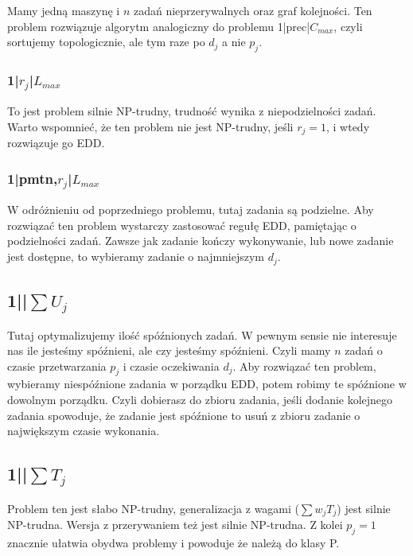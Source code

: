 \documentclass{../notatki}
\begin{document}
Mamy jedną maszynę i $n$ zadań nieprzerywalnych oraz graf kolejności.
Ten problem rozwiązuje algorytm analogiczny do problemu 1|prec|$C_{max}$, czyli
sortujemy topologicznie, ale tym raze po $d_j$ a nie $p_j$.

\subsubsection{1|\texorpdfstring{$r_j$}{rj}|\texorpdfstring{$L_{max}$}{Lmax}}

To jest problem silnie NP-trudny, trudność wynika z niepodzielności zadań.
Warto wspomnieć, że ten problem nie jest NP-trudny, jeśli $r_j = 1$, i wtedy
rozwiązuje go EDD.

\subsubsection{1|pmtn,\texorpdfstring{$r_j$}{rj}|\texorpdfstring{$L_{max}$}{Lmax}}

W odróżnieniu od poprzedniego problemu, tutaj zadania są podzielne.
Aby rozwiązać
ten problem wystarczy zastosować regułę EDD, pamiętając o podzielności zadań.
Zawsze jak zadanie kończy wykonywanie, lub nowe zadanie jest dostępne, to
wybieramy zadanie o najmniejszym $d_j$.

\subsection{1||\texorpdfstring{$\sum U_j$}{sum Uj}}

Tutaj optymalizujemy ilość spóźnionych zadań. W pewnym sensie nie interesuje
nas ile jesteśmy spóźnieni, ale czy jesteśmy spóźnieni. Czyli mamy $n$ zadań
o czasie przetwarzania $p_j$ i czasie oczekiwania $d_j$. Aby
rozwiązać ten problem,
wybieramy niespóźnione zadania w porządku EDD, potem robimy te
spóźnione w dowolnym porządku. Czyli dobierasz do zbioru zadania, jeśli
dodanie kolejnego zadania spowoduje, że zadanie jest spóźnione to usuń
z zbioru zadanie o największym czasie wykonania.

\subsection{1||\texorpdfstring{$\sum T_j$}{sum Tj}}

Problem ten jest słabo NP-trudny, generalizacja z wagami ($\sum w_j T_j$)
jest silnie NP-trudna. Wersja z przerywaniem też jest silnie NP-trudna.
Z kolei $p_j = 1$ znacznie ułatwia obydwa problemy i powoduje że należą
do klasy P.
\end{document}
